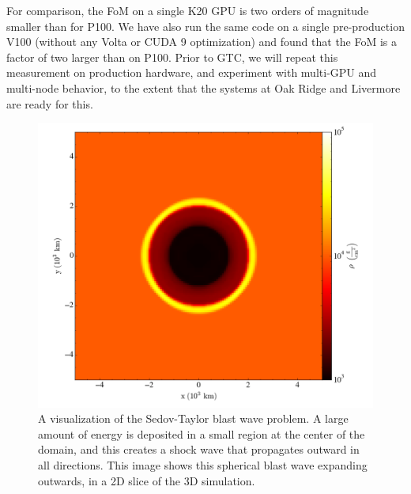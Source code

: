 \documentclass[numberedappendix]{aastex6}
\begin{document}
For comparison, the FoM on a single K20 GPU is two orders of magnitude smaller than for P100.
We have also run the same code on a single pre-production V100 (without any Volta or CUDA 9 optimization)
and found that the FoM is a factor of two larger than on P100. Prior to GTC, we will repeat
this measurement on production hardware, and experiment with multi-GPU and multi-node
behavior, to the extent that the systems at Oak Ridge and Livermore are ready for this.

\begin{figure}[h!]
  \begin{center}
    \includegraphics[scale=0.65]{sedov.png}
    \caption{A visualization of the Sedov-Taylor blast wave problem. A large amount of energy
      is deposited in a small region at the center of the domain, and this creates a shock
      wave that propagates outward in all directions. This image shows this spherical blast
      wave expanding outwards, in a 2D slice of the 3D simulation.}
  \end{center}
\end{figure}
\end{document}
